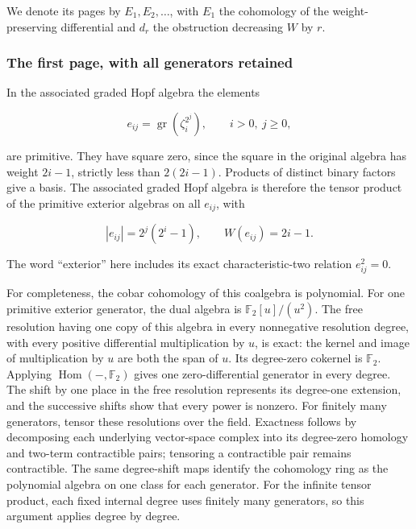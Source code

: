 We denote its pages by \(E_1,E_2,\ldots\), with \(E_1\) the cohomology of the weight-preserving differential and \(d_r\) the obstruction decreasing \(W\) by \(r\).

\subsubsection{The first page, with all generators retained}

In the associated graded Hopf algebra the elements

\begin{equation}
e_{ij}=\operatorname{gr}(\zeta_i^{2^j}),\qquad i>0,\ j\geq0,
 \label{courseIII:the-degree-six-milnor-cobar-calculation:eq:2.5}
\end{equation}

are primitive. They have square zero, since the square in the original algebra has weight \(2i-1\), strictly less than \(2(2i-1)\). Products of distinct binary factors give a basis. The associated graded Hopf algebra is therefore the tensor product of the primitive exterior algebras on all \(e_{ij}\), with

\begin{equation}
|e_{ij}|=2^j(2^i-1),\qquad W(e_{ij})=2i-1.
 \label{courseIII:the-degree-six-milnor-cobar-calculation:eq:2.6}
\end{equation}

The word ``exterior'' here includes its exact characteristic-two relation \(e_{ij}^2=0\).

For completeness, the cobar cohomology of this coalgebra is polynomial. For one primitive exterior generator, the dual algebra is \(\mathbb F _2[u]/(u^2)\). The free resolution having one copy of this algebra in every nonnegative resolution degree, with every positive differential multiplication by \(u\), is exact: the kernel and image of multiplication by \(u\) are both the span of \(u\). Its degree-zero cokernel is \(\mathbb F _2\). Applying \(\operatorname{Hom}(-,\mathbb F _2)\) gives one zero-differential generator in every degree. The shift by one place in the free resolution represents its degree-one extension, and the successive shifts show that every power is nonzero. For finitely many generators, tensor these resolutions over the field. Exactness follows by decomposing each underlying vector-space complex into its degree-zero homology and two-term contractible pairs; tensoring a contractible pair remains contractible. The same degree-shift maps identify the cohomology ring as the polynomial algebra on one class for each generator. For the infinite tensor product, each fixed internal degree uses finitely many generators, so this argument applies degree by degree.

